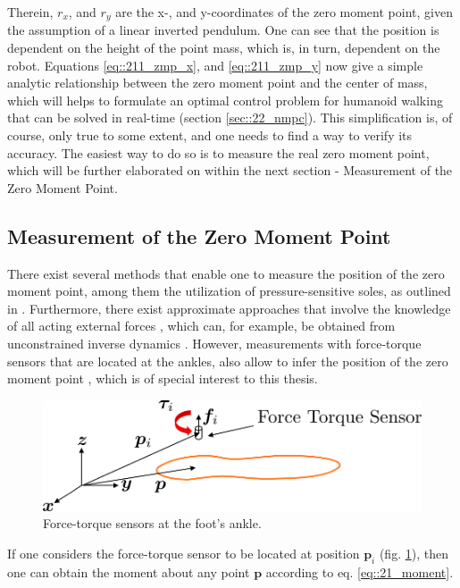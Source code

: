 Therein, $r_x$, and $r_y$ are the x-, and y-coordinates of the zero moment point, given the assumption of a linear inverted pendulum. One can see that the position is dependent on the height of the point mass, which is, in turn, dependent on the robot. Equations \ref{eq::211_zmp_x}, and \ref{eq::211_zmp_y} now give a simple analytic relationship between the zero moment point and the center of mass, which will helps to formulate an optimal control problem for humanoid walking that can be solved in real-time (section \ref{sec::22_nmpc}). This simplification is, of course, only true to some extent, and one needs to find a way to verify its accuracy. The easiest way to do so is to measure the real zero moment point, which will be further elaborated on within the next section - Measurement of the Zero Moment Point.
\FloatBarrier
\subsection{Measurement of the Zero Moment Point}
There exist several methods that enable one to measure the position of the zero moment point, among them the utilization of pressure-sensitive soles, as outlined in \cite{kajita2014introduction}. Furthermore, there exist approximate approaches that involve the knowledge of all acting external forces \cite{huang2001planning}, which can, for example, be obtained from unconstrained inverse dynamics \cite{michel2017dynamic}. However, measurements with force-torque sensors that are located at the ankles, also allow to infer the position of the zero moment point \cite{kajita2014introduction}, which is of special interest to this thesis.
\begin{figure}[h!]
	\centering
	\includegraphics[scale=.5]{chapters/02_foundations_for_humanoid_walking/img/ft_sensor.png}
	\caption{Force-torque sensors at the foot's ankle.}
	\label{fig::21_force_torque}
\end{figure}
If one considers the force-torque sensor to be located at position $\bm{p}_i$ (fig. \ref{fig::21_force_torque}), then one can obtain the moment about any point $\bm{p}$ according to eq. \ref{eq::21_moment}.
